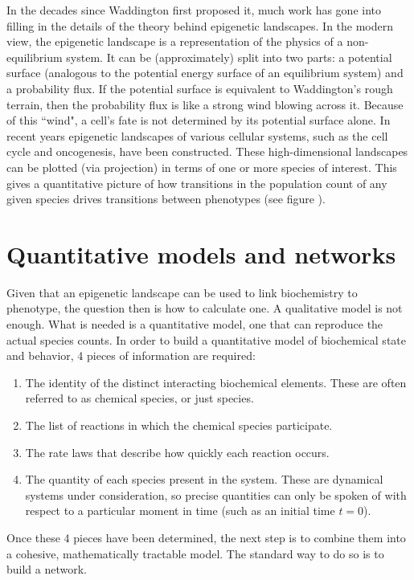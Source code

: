 In the decades since Waddington first proposed it, much work has gone into filling in the details of the theory behind epigenetic landscapes. In the modern view\supercite{Xu:2016dw,Wu:2014gf,Wu:2013dx}, the epigenetic landscape is a representation of the physics of a non-equilibrium system. It can be (approximately) split into two parts: a potential surface (analogous to the potential energy surface of an equilibrium system) and a probability flux. If the potential surface is equivalent to Waddington's rough terrain, then the probability flux is like a strong wind blowing across it. Because of this ``wind", a cell's fate is not determined by its potential surface alone. In recent years epigenetic landscapes of various cellular systems, such as the cell cycle\supercite{Li:2014iw,Luo:2017iw} and oncogenesis\supercite{Li:2014ho,ArandaAnzaldo:2018bf}, have been constructed. These high-dimensional landscapes can be plotted (via projection) in terms of one or more species of interest. This gives a quantitative picture of how transitions in the population count of any given species drives transitions between phenotypes (see figure ).

\section{Quantitative models and networks}
\label{sec:quant_models}

Given that an epigenetic landscape can be used to link biochemistry to phenotype, the question then is how to calculate one. A qualitative model is not enough. What is needed is a quantitative model, one that can reproduce the actual species counts. In order to build a quantitative model of biochemical state and behavior, 4 pieces of information are required:
\begin{enumerate}
    \item\label{item:species} The identity of the distinct interacting biochemical elements. These are often referred to as chemical species, or just species.
    \item The list of reactions in which the chemical species participate.
    \item The rate laws that describe how quickly each reaction occurs. 
    \item The quantity of each species present in the system. These are dynamical systems under consideration, so precise quantities can only be spoken of with respect to a particular moment in time (such as an initial time $t=0$).
\end{enumerate}
Once these 4 pieces have been determined, the next step is to combine them into a cohesive, mathematically tractable model. The standard way to do so is to build a network.

